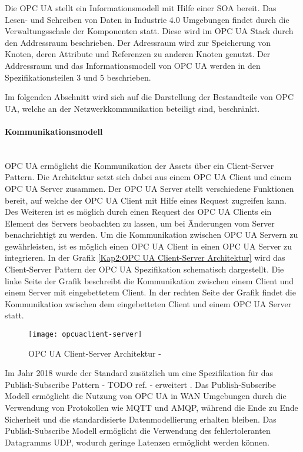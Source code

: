 \clearpage

Die \ac{OPC UA} stellt ein Informationsmodell mit Hilfe einer \ac{SOA} bereit. Das Lesen- und Schreiben von Daten in Industrie 4.0 Umgebungen findet durch die Verwaltungsschale der Komponenten statt. Diese wird im \ac{OPC UA} Stack durch den Addressraum beschrieben. Der Adressraum wird zur Speicherung von Knoten, deren Attribute und Referenzen zu anderen Knoten genutzt. Der Addressraum und das Informationsmodell von \ac{OPC UA} werden in den Spezifikationsteilen 3 \cite{opcpc3} und 5 \cite{opcpt5} beschrieben.

Im folgenden Abschnitt wird sich auf die Darstellung der Bestandteile von \ac{OPC UA}, welche an der Netzwerkkommunikation beteiligt sind, beschränkt.

\paragraph{Kommunikationsmodell}\mbox{}\\
\ac{OPC UA} ermöglicht die Kommunikation der Assets über ein Client-Server Pattern. Die Architektur setzt sich dabei aus einem \ac{OPC UA} Client und einem \ac{OPC UA} Server zusammen. Der \ac{OPC UA} Server stellt verschiedene Funktionen bereit, auf welche der \ac{OPC UA} Client mit Hilfe eines Request zugreifen kann. Des Weiteren ist es möglich durch einen Request des \ac{OPC UA} Clients ein Element des Servers beobachten zu lassen, um bei Änderungen vom Server benachrichtigt zu werden. Um die Kommunikation zwischen \ac{OPC UA} Servern zu gewährleisten, ist es möglich einen \ac{OPC UA} Client in einen \ac{OPC UA} Server zu integrieren. In der Grafik \autoref{Kap2:OPC UA Client-Server Architektur} wird das Client-Server Pattern der \ac{OPC UA} Spezifikation schematisch dargestellt. Die linke Seite der Grafik beschreibt die Kommunikation zwischen einem Client und einem Server mit eingebettetem Client. In der rechten Seite der Grafik findet die Kommunikation zwischen dem eingebetteten Client und einem \ac{OPC UA} Server statt.

\begin{figure}[h]
  \centering
  \texttt{[image: opcuaclient-server]}
  \caption{OPC UA Client-Server Architektur - \cite{opcpt1}} 
  \label{Kap2:OPC UA Client-Server Architektur}
\end{figure}

Im Jahr 2018 wurde der Standard zusätzlich um eine Spezifikation für das Publish-Subscribe Pattern - TODO ref. - erweitert \cite{hoppe2018}. Das Publish-Subscribe Modell ermöglicht die Nutzung von \ac{OPC UA} in \ac{WAN} Umgebungen durch die Verwendung von Protokollen wie \ac{MQTT} und \ac{AMQP}, während die Ende zu Ende Sicherheit und die standardisierte Datenmodellierung erhalten bleiben. Das Publish-Subscribe Modell ermöglicht die Verwendung des fehlertoleranten Datagramms \ac{UDP}, wodurch geringe Latenzen ermöglicht werden können. 

